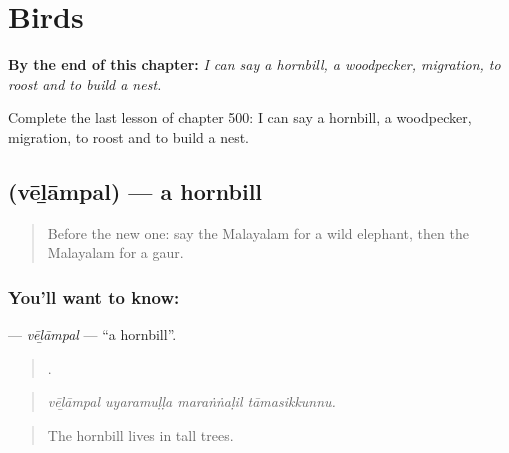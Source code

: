 
\chapter{Birds}
\label{ch:ml-birds}

\begin{chapteropening}
\textbf{By the end of this chapter:} \emph{I can say a hornbill, a woodpecker, migration, to roost and to build a nest.}

Complete the last lesson of chapter 500: I can say a hornbill, a woodpecker, migration, to roost and to build a nest.
\end{chapteropening}

\section[\texorpdfstring{\ml{വേഴാമ്പൽ} (vēḻāmpal)}{വേഴാമ്പൽ (vēḻāmpal)}]{ (vēḻāmpal) — a hornbill}

\label{lesson:ML-C500-velampal}



\begin{quote}
Before the new one: say the Malayalam for a wild elephant, then the Malayalam for a gaur.
\end{quote}

\subsection*{You'll want to know: }
\textbf{} — \emph{vēḻāmpal} — \textquotedblleft{}a hornbill\textquotedblright{}.

\begin{quote}
   .
\end{quote}

\begin{quote}
\emph{vēḻāmpal uyaramuḷḷa maraṅṅaḷil tāmasikkunnu.}
\end{quote}

\begin{quote}
The hornbill lives in tall trees.
\end{quote}

